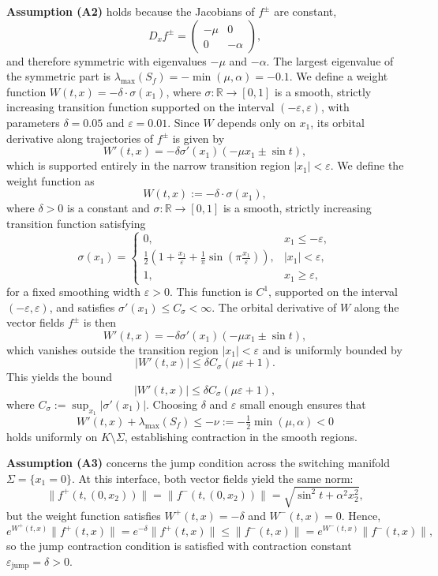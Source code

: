 \documentclass[11pt]{article}
\begin{document}
\noindent\textbf{Assumption (A2)} holds because the Jacobians of \( f^\pm \) are constant,
\[
D_x f^\pm = \begin{pmatrix} -\mu & 0 \\ 0 & -\alpha \end{pmatrix},
\]
and therefore symmetric with eigenvalues \( -\mu \) and \( -\alpha \). The largest eigenvalue of the symmetric part is \( \lambda_{\max}(S_f) = -\min(\mu, \alpha) = -0.1 \). We define a weight function \( W(t, x) = -\delta \cdot \sigma(x_1) \), where \( \sigma \colon \mathbb{R} \to [0,1] \) is a smooth, strictly increasing transition function supported on the interval \( (-\varepsilon, \varepsilon) \), with parameters \( \delta = 0.05 \) and \( \varepsilon = 0.01 \). Since \( W \) depends only on \( x_1 \), its orbital derivative along trajectories of \( f^\pm \) is given by
\[
W'(t, x) = -\delta \sigma'(x_1)(-\mu x_1 \pm \sin t),
\]
which is supported entirely in the narrow transition region \( |x_1| < \varepsilon \).  We define the weight function as
\[
W(t, x) := -\delta \cdot \sigma(x_1),
\]
where \( \delta > 0 \) is a constant and \( \sigma \colon \mathbb{R} \to [0,1] \) is a smooth, strictly increasing transition function satisfying
\[
\sigma(x_1) =
\begin{cases}
	0, & x_1 \le -\varepsilon, \\
	\frac{1}{2} \left( 1 + \frac{x_1}{\varepsilon} + \frac{1}{\pi} \sin\left( \pi \frac{x_1}{\varepsilon} \right) \right), & |x_1| < \varepsilon, \\
	1, & x_1 \ge \varepsilon,
\end{cases}
\]
for a fixed smoothing width \( \varepsilon > 0 \). This function is \( C^1 \), supported on the interval \( (-\varepsilon, \varepsilon) \), and satisfies \( \sigma'(x_1) \le C_\sigma < \infty \). The orbital derivative of \( W \) along the vector fields \( f^\pm \) is then
\[
W'(t,x) = -\delta \sigma'(x_1)(-\mu x_1 \pm \sin t),
\]
which vanishes outside the transition region \( |x_1| < \varepsilon \) and is uniformly bounded by
\[
|W'(t,x)| \le \delta C_\sigma(\mu \varepsilon + 1).
\]
This yields the bound
\[
|W'(t,x)| \leq \delta C_\sigma (\mu \varepsilon + 1),
\]
where \( C_\sigma := \sup_{x_1} |\sigma'(x_1)| \). Choosing \( \delta \) and \( \varepsilon \) small enough ensures that
\[
W'(t,x) + \lambda_{\max}(S_f) \leq -\nu := -\tfrac{1}{2} \min(\mu, \alpha) < 0
\]
holds uniformly on \( K \setminus \Sigma \), establishing contraction in the smooth regions.

\noindent\textbf{Assumption (A3)} concerns the jump condition across the switching manifold \( \Sigma = \{ x_1 = 0 \} \). At this interface, both vector fields yield the same norm:
\[
\|f^+(t,(0,x_2))\| = \|f^-(t,(0,x_2))\| = \sqrt{\sin^2 t + \alpha^2 x_2^2},
\]
but the weight function satisfies \( W^+(t,x) = -\delta \) and \( W^-(t,x) = 0 \). Hence,
\[
e^{W^+(t,x)} \|f^+(t,x)\| = e^{-\delta} \|f^+(t,x)\| \leq \|f^-(t,x)\| = e^{W^-(t,x)} \|f^-(t,x)\|,
\]
so the jump contraction condition is satisfied with contraction constant \( \varepsilon_{\text{jump}} = \delta > 0 \).
\end{document}
